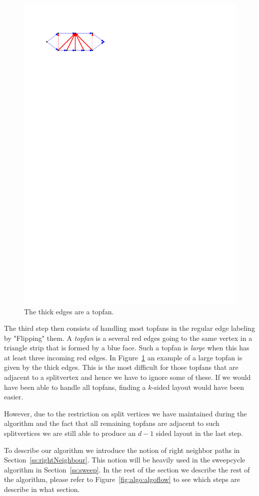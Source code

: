   \begin{figure}
    \centering
    \includegraphics[]{unifiedAlgo/img/topfanExample.pdf}
    \caption{The thick edges are a topfan.}
    \label{fig:algo:topfanExample}
  \end{figure}

  The third step then consists of handling most topfans in the regular edge labeling by "Flipping" them.
  A \emph{topfan} is a several red edges going to the same vertex in a triangle strip that is formed by a blue face.
  Such a topfan is \emph{large} when this has at least three incoming red edges.
  In Figure~\ref{fig:algo:topfanExample} an example of a large topfan is given by the thick edges.
  This is the most difficult for those topfans that are adjacent to a splitvertex and hence we have to ignore some of these.
  If we would have been able to handle all topfans, finding a $k$-sided layout would have been easier.

  However, due to the restriction on split vertices we have maintained during the algorithm and the fact that all remaining topfans are adjacent to such splitvertices we are still able to produce an $d-1$ sided layout in the last step.

  To describe our algorithm we introduce the notion of right neighbor paths in Section~\ref{ss:rightNeighbour}. This notion will be heavily used in the sweepcycle algorithm in Section~\ref{ss:sweep}. In the rest of the section we describe the rest of the algorithm, please refer to Figure~\ref{fig:algo:algoflow} to see which steps are describe in what section.
